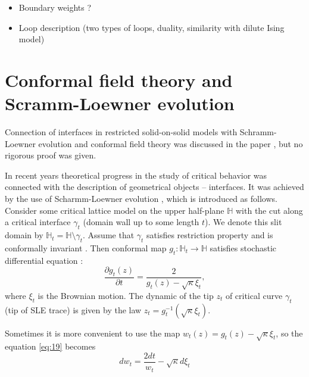 \documentclass[12pt]{article}
\begin{document}
\begin{itemize}
\item Boundary weights ?
\item Loop description (two types of loops, duality, similarity with dilute Ising model) 
\end{itemize}

\section{Conformal field theory and Scramm-Loewner evolution}
\label{sec:conf-field-theory}

Connection of interfaces in restricted solid-on-solid models with
Schramm-Loewner evolution and conformal field theory was discussed in
the paper \cite{cardy2007ade}, but no rigorous proof was given.

In recent
years theoretical progress in the study of critical behavior was connected with the description of
geometrical objects -- interfaces. It was achieved by the use of
Scharmm-Loewner evolution \cite{schramm2000scaling}, which is
introduced as follows. 
Consider some critical lattice model on the upper half-plane
$\mathbb{H}$ with the cut along a critical interface $\gamma_{t}$
(domain wall up to some length $t$). We denote this slit domain by
$\mathbb{H}_{t}=\mathbb{H}\setminus \gamma_{t}$. Assume that
$\gamma_{t}$ satisfies restriction property and is conformally
invariant \cite{Cardy:2005kh}. Then conformal map
$g_{t}:\mathbb{H}_{t}\to \mathbb{H}$ satisfies stochastic differential
equation \cite{schramm2000scaling}:
\begin{equation}
\label{eq:19}
  \frac{\partial g_t(z)}{\partial t} = \frac{ 2}{g_t(z)-\sqrt{\kappa}\xi_{t}} ,
\end{equation}
where $\xi_{t}$ is the Brownian motion. The dynamic of the tip $z_{t}$ of critical curve $\gamma_{t}$ (tip of SLE trace) is given by the law $z_{t}=g_{t}^{-1}(\sqrt{\kappa}\xi_{t})$. 

Sometimes it is more convenient to use the map $w_{t} (z)=g_{t}(z)-\sqrt{\kappa}\xi_{t}$, so the equation \eqref{eq:19} becomes
\begin{equation}
  \label{eq:20}
       d w _{t}= \frac{2dt}{w_{t} }-\sqrt{\kappa}d\xi_{t}  
\end{equation}
\end{document}
